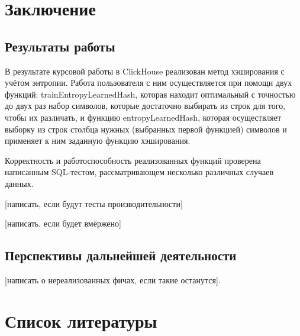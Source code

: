 \documentclass[a4paper,12pt]{extarticle}
\begin{document}
\begin{sloppypar}
\newpage

\section{Заключение}
\subsection{Результаты работы}
В результате курсовой работы в ClickHouse реализован метод хэширования с учётом энтропии. Работа пользователя с ним осуществляется при помощи двух функций: trainEntropyLearnedHash, которая находит оптимальный с точностью до двух раз набор символов, которые достаточно выбирать из строк для того, чтобы их различать, и функцию entropyLearnedHash, которая осуществляет выборку из строк столбца нужных (выбранных первой функцией) символов и применяет к ним заданную функцию хэширования.

Корректность и работоспособность реализованных функций проверена написанным SQL-тестом, рассматривающем несколько различных случаев данных.

[написать, если будут тесты производительности]

[написать, если будет вмёржено]

\subsection{Перспективы дальнейшей деятельности}

[написать о нереализованных фичах, если такие останутся].

\newpage

\section{Список литературы}
\printbibliography[heading=none]
\newpage

\end{sloppypar}


\end{document}
